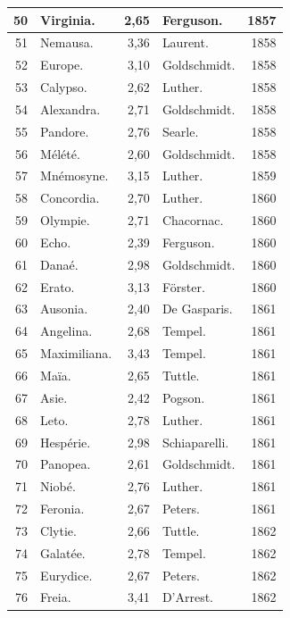 \documentclass[a4paper, 11pt, oneside]{article}
\begin{document}
\begin{center}
\begin{longtable}{|r|l|r|l|r|}
        50 & Virginia. & 2,65 & Ferguson. & 1857 \\ \hline
        51 & Nemausa. & 3,36 & Laurent. & 1858 \\ \hline
        52 & Europe. & 3,10 & Goldschmidt. & 1858 \\ \hline
        53 & Calypso. & 2,62 & Luther. & 1858 \\ \hline
        54 & Alexandra. & 2,71 & Goldschmidt. & 1858 \\ \hline
        55 & Pandore. & 2,76 & Searle. & 1858 \\ \hline
        56 & Mélété. & 2,60 & Goldschmidt. & 1858 \\ \hline
        57 & Mnémosyne. & 3,15 & Luther. & 1859 \\ \hline
        58 & Concordia. & 2,70 & Luther. & 1860 \\ \hline
        59 & Olympie. & 2,71 & Chacornac. & 1860 \\ \hline
        60 & Echo. & 2,39 & Ferguson. & 1860 \\ \hline
        61 & Danaé. & 2,98 & Goldschmidt. & 1860 \\ \hline
        62 & Erato. & 3,13 & Förster. & 1860 \\ \hline
        63 & Ausonia. & 2,40 & De Gasparis. & 1861 \\ \hline
        64 & Angelina. & 2,68 & Tempel. & 1861 \\ \hline
        65 & Maximiliana. & 3,43 & Tempel. & 1861 \\ \hline
        66 & Maïa. & 2,65 & Tuttle. & 1861 \\ \hline
        67 & Asie. & 2,42 & Pogson. & 1861 \\ \hline
        68 & Leto. & 2,78 & Luther. & 1861 \\ \hline
        69 & Hespérie. & 2,98 & Schiaparelli. & 1861 \\ \hline
        70 & Panopea. & 2,61 & Goldschmidt. & 1861 \\ \hline
        71 & Niobé. & 2,76 & Luther. & 1861 \\ \hline
        72 & Feronia. & 2,67 & Peters. & 1861 \\ \hline
        73 & Clytie. & 2,66 & Tuttle. & 1862 \\ \hline
        74 & Galatée. & 2,78 & Tempel. & 1862 \\ \hline
        75 & Eurydice. & 2,67 & Peters. & 1862 \\ \hline
        76 & Freia. & 3,41 & D'Arrest. & 1862 \\ \hline

\end{longtable}
\end{center}
\end{document}
